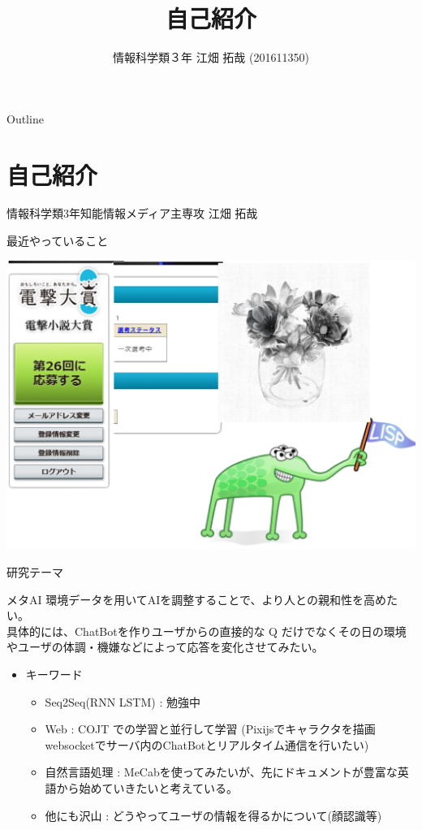 \documentclass[dvipdfmx,10pt,presentation]{beamer}
\author{情報科学類３年 江畑 拓哉 (201611350)}
\date{}
\title{自己紹介}
\begin{document}
\maketitle
\begin{frame}{Outline}
\tableofcontents
\end{frame}

\section{自己紹介}
\label{sec:org68c62cd}
\begin{frame}[label={sec:orgd110fd4}]{}
情報科学類3年知能情報メディア主専攻 江畑 拓哉\\
\begin{block}{最近やっていること}
\begin{center}
\includegraphics[width=0.7\linewidth]{./res.png}
\end{center}
\end{block}
\end{frame}
\begin{frame}[label={sec:org42f3beb}]{研究テーマ}
\begin{block}{メタAI}
環境データを用いてAIを調整することで、より人との親和性を高めたい。\\
具体的には、ChatBotを作りユーザからの直接的な Q だけでなくその日の環境やユーザの体調・機嫌などによって応答を変化させてみたい。\\
\begin{itemize}
\item キーワード\\
\begin{itemize}
\item Seq2Seq(RNN LSTM) : 勉強中\\
\item Web : COJT での学習と並行して学習 (Pixijsでキャラクタを描画 websocketでサーバ内のChatBotとリアルタイム通信を行いたい)\\
\item 自然言語処理 : MeCabを使ってみたいが、先にドキュメントが豊富な英語から始めていきたいと考えている。\\
\item 他にも沢山 : どうやってユーザの情報を得るかについて(顔認識等)\\
\end{itemize}
\end{itemize}
\end{block}
\end{frame}
\end{document}
